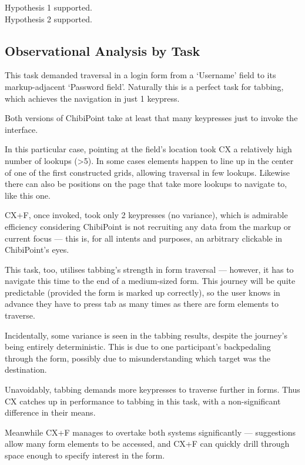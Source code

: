 \documentclass[a4paper, 12pt]{report}
\begin{document}
Hypothesis 1 supported.\\
Hypothesis 2 supported.

%
%
%
%
%

\subsection{Observational Analysis by Task}
\label{sec:efficiencydiscussion}
\setcounter{TaskType}{0}
This task demanded traversal in a login form from a `Username' field to its markup-adjacent `Password field'. Naturally this is a perfect task for tabbing, which achieves the navigation in just 1 keypress.

Both versions of ChibiPoint take at least that many keypresses just to invoke the interface.

In this particular case, pointing at the field's location took CX a relatively high number of lookups (>5). In some cases elements happen to line up in the center of one of the first constructed grids, allowing traversal in few lookups. Likewise there can also be positions on the page that take more lookups to navigate to, like this one. 

CX+F, once invoked, took only 2 keypresses (no variance), which is admirable efficiency considering ChibiPoint is not recruiting any data from the markup or current focus --- this is, for all intents and purposes, an arbitrary clickable in ChibiPoint's eyes.

This task, too, utilises tabbing's strength in form traversal --- however, it has to navigate this time to the end of a medium-sized form. This journey will be quite predictable (provided the form is marked up correctly), so the user knows in advance they have to press tab as many times as there are form elements to traverse.

Incidentally, some variance is seen in the tabbing results, despite the journey's being entirely deterministic. This is due to one participant's backpedaling through the form, possibly due to misunderstanding which target was the destination.

Unavoidably, tabbing demands more keypresses to traverse further in forms. Thus CX catches up in performance to tabbing in this task, with a non-significant difference in their means.

Meanwhile CX+F manages to overtake both systems significantly --- suggestions allow many form elements to be accessed, and CX+F can quickly drill through space enough to specify interest in the form.
\end{document}
